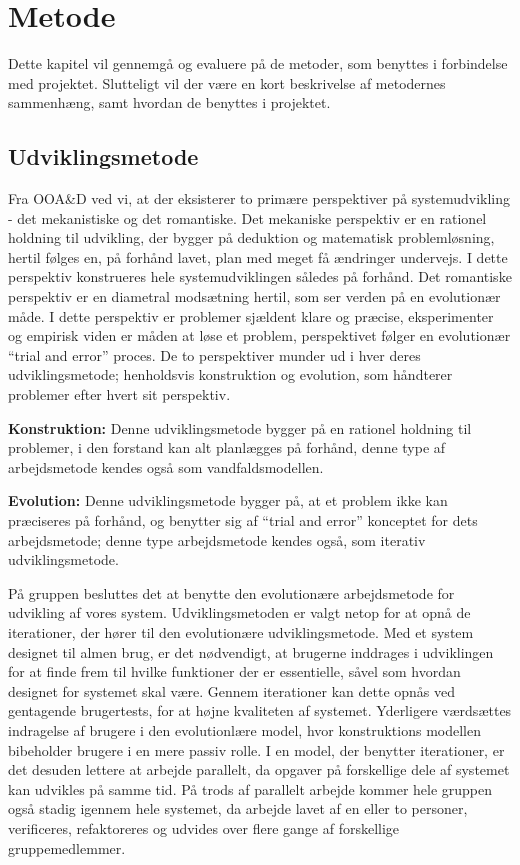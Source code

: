 \chapter{Metode}\label{chapter:Metode}

Dette kapitel vil gennemgå og evaluere på de metoder, som benyttes i forbindelse med projektet.
Slutteligt vil der være en kort beskrivelse af metodernes sammenhæng, samt hvordan de benyttes i projektet.

\section{Udviklingsmetode}\label{s:udviklingsmetode}
Fra OOA\&D ved vi, at der eksisterer to primære perspektiver på systemudvikling - det mekanistiske og det romantiske.
Det mekaniske perspektiv er en rationel holdning til udvikling, der bygger på deduktion og matematisk problemløsning, hertil følges en, på forhånd lavet, plan med meget få ændringer undervejs.
I dette perspektiv konstrueres hele systemudviklingen således på forhånd.
Det romantiske perspektiv er en diametral modsætning hertil, som ser verden på en evolutionær måde.
I dette perspektiv er problemer sjældent klare og præcise, eksperimenter og empirisk viden er måden at løse et problem, perspektivet følger en evolutionær ``trial and error'' proces.
De to perspektiver munder ud i hver deres udviklingsmetode; henholdsvis konstruktion og evolution, som håndterer problemer efter hvert sit perspektiv.\citep{OOA&D2001} 

\textbf{Konstruktion:}
Denne udviklingsmetode bygger på en rationel holdning til problemer, i den forstand kan alt planlægges på forhånd, denne type af arbejdsmetode kendes også som vandfaldsmodellen.

\textbf{Evolution:}
Denne udviklingsmetode bygger på, at et problem ikke kan præciseres på forhånd, og benytter sig af ``trial and error'' konceptet for dets arbejdsmetode; denne type arbejdsmetode kendes også, som iterativ udviklingsmetode.

På gruppen besluttes det at benytte den evolutionære arbejdsmetode for udvikling af vores system. 
Udviklingsmetoden er valgt netop for at opnå de iterationer, der hører til den evolutionære udviklingsmetode. 
Med et system designet til almen brug, er det nødvendigt, at brugerne inddrages i udviklingen for at finde frem til hvilke funktioner der er essentielle, såvel som hvordan designet for systemet skal være. 
Gennem iterationer kan dette opnås ved gentagende brugertests, for at højne kvaliteten af systemet. 
Yderligere værdsættes indragelse af brugere i den evolutionlære model, hvor konstruktions modellen bibeholder brugere i en mere passiv rolle.
I en model, der benytter iterationer, er det desuden lettere at arbejde parallelt, da opgaver på forskellige dele af systemet kan udvikles på samme tid.
På trods af parallelt arbejde kommer hele gruppen også stadig igennem hele systemet, da arbejde lavet af en eller to personer, verificeres, refaktoreres og udvides over flere gange af forskellige gruppemedlemmer.

